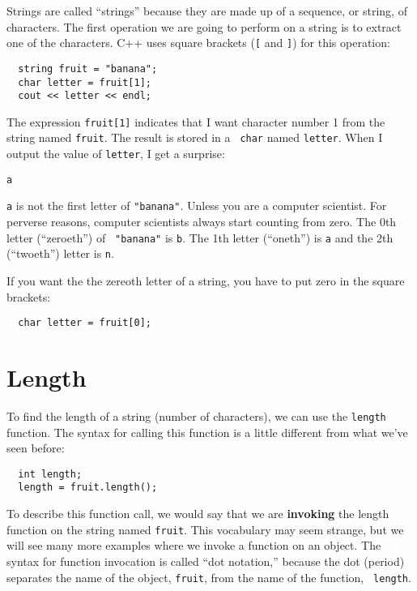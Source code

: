 Strings are called ``strings'' because they are made up of a sequence,
or string, of characters.  The first operation we are going to
perform on a string is to extract one of the characters.  C++
uses square brackets ({\tt [} and {\tt ]}) for this operation:

\begin{lstlisting}
  string fruit = "banana";
  char letter = fruit[1];
  cout << letter << endl;
\end{lstlisting}
%
The expression {\tt fruit[1]} indicates that I want character number 1
from the string named {\tt fruit}.  The result is stored in a {\tt
char} named {\tt letter}.  When I output the value of {\tt letter}, I
get a surprise:

\begin{lstlisting}
a
\end{lstlisting}
%
{\tt a} is not the first letter of {\tt "banana"}.  Unless you are a
computer scientist.  For perverse reasons, computer scientists always
start counting from zero.  The 0th letter (``zeroeth'') of {\tt
"banana"} is {\tt b}.  The 1th letter (``oneth'') is {\tt a} and the
2th (``twoeth'') letter is {\tt n}.

If you want the the zereoth letter of a string, you have to put
zero in the square brackets:

\begin{lstlisting}
  char letter = fruit[0];
\end{lstlisting}

\section{Length}

To find the length of a string (number of characters), we can
use the {\tt length} function.  The syntax for calling this
function is a little different from what we've seen before:

\begin{lstlisting}
  int length;
  length = fruit.length();
\end{lstlisting}
%
To describe this function call, we would say that we are {\bf
invoking} the length function on the string named {\tt fruit}.  This
vocabulary may seem strange, but we will see many more examples where
we invoke a function on an object.  The syntax for function invocation
is called ``dot notation,'' because the dot (period) separates the
name of the object, {\tt fruit}, from the name of the function, {\tt
length}.

